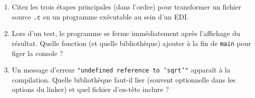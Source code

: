 \documentclass[11pt]{article}
\begin{document}
\begin{exercice}
\begin{enumerate}
    \item Citez les trois étapes principales (dans l'ordre) pour transformer un fichier source \texttt{.c} en un programme exécutable au sein d'un EDI.
    \item Lors d'un test, le programme se ferme immédiatement après l'affichage du résultat. Quelle fonction (et quelle bibliothèque) ajouter à la fin de \texttt{main} pour figer la console ?
    \item Un message d'erreur \texttt{"undefined reference to `sqrt'"} apparaît à la compilation. Quelle bibliothèque faut-il lier (souvent optionnelle dans les options du linker) et quel fichier d'en-tête inclure ?
\end{enumerate}
\end{exercice}
\end{document}
